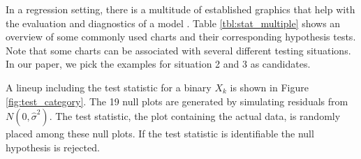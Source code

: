 \documentclass{article}
\begin{document}
In a regression setting, there is a multitude of established graphics that help with the evaluation and diagnostics of a model \citep{cook:99}. Table \ref{tbl:stat_multiple} shows an overview of some commonly used charts and their corresponding hypothesis tests. Note that some charts can be associated with several different testing situations. In our paper, we pick the examples for situation 2 and 3 as candidates.

A lineup including the test statistic  for a binary $X_k$ is shown in Figure \ref{fig:test_category}. The 19 null plots are generated  by simulating residuals from $N(0,\hat{\sigma}^2)$. The test statistic, the plot containing the actual data, is randomly placed among these null plots. If the test statistic is identifiable the null hypothesis is rejected. %
\end{document}
